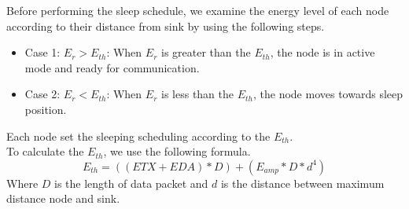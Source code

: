 \documentclass{article}
\begin{document}
Before performing the sleep schedule, we examine the energy level of each node according to their distance from sink by using the following steps.
\begin{itemize}
  \item Case 1: $E_r>E_{th}$: When $E_r$ is greater than the $E_{th}$, the node is in active mode and ready for communication.
  \item Case 2: $E_r<E_{th}$: When $E_r$ is less than the $E_{th}$, the node moves towards sleep position.
\end{itemize}
Each node set the sleeping scheduling according to the $E_{th}$.\\
To calculate the $E_{th}$, we use the following formula.
\begin{equation}
E_{th}=((ETX+EDA)*D)+(E_{amp}*D*d^4)
\end{equation}
Where $D$ is the length of data packet and $d$ is the distance between maximum distance node and sink.
\end{document}
